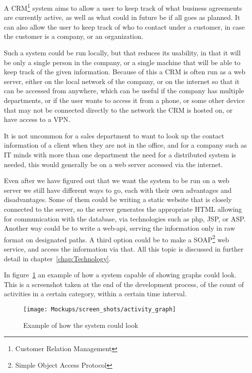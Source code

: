 A CRM\footnote{Customer Relation Management} system aims to allow a user to keep
track of what business agreements are currently active, as well as what could in
future be if all goes as planned. It can also allow the user to keep track of
who to contact under a customer, in case the customer is a company, or an
organization. 

Such a system could be run locally, but that reduces its usability, in that it
will be only a single person in the company, or a single machine that will be
able to keep track of the given information. Because of this a CRM is often run
as a web server, either on the local network of the company, or on the internet
so that it can be accessed from anywhere, which can be useful if the company has
multiple departments, or if the user wants to access it from a phone, or some
other device that may not be connected directly to the network the CRM is hosted
on, or have access to a VPN. 

It is not uncommon for a sales department to want to look up the contact
information of a client when they are not in the office, and for a company such
as IT minds with more than one department the need for a distributed system is
needed, this would generally be on a web server accessed via the internet. 

Even after we have figured out that we want the system to be run on a web server
we still have different ways to go, each with their own advantages and
disadvantages. Some of them could be writing a static website that is closely
connected to the server, so the server generates the appropriate HTML allowing
for communication with the database, via technologies such as php, JSP, or ASP.
Another way could be to write a web-api, serving the information only in raw
format on designated paths. A third option could be to make a
SOAP\footnote{Simple Object Access Protocol} web service, and access the
information via that. All this topic is discussed in further detail in
chapter~\ref{chap:Technology}. 

In figure~\ref{fig:sys_example} an example of how a system capable of showing
graphs could look. This is a screenshot taken at the end of the development
process, of the count of activities in a certain category, within a certain time interval.

\begin{figure}[h]
\centering
\texttt{[image: Mockups/screen\_shots/activity\_graph]}
\caption{Example of how the system could look}
\label{fig:sys_example}
\end{figure}

